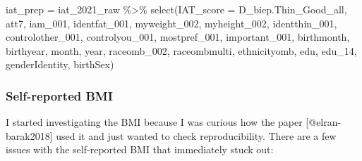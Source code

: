\documentclass[
  letterpaper,
  DIV=11,
  numbers=noendperiod]{scrartcl}
\newenvironment{Shaded}{\begin{snugshade}}{\end{snugshade}}
\newcommand{\AttributeTok}[1]{\textcolor[rgb]{0.40,0.45,0.13}{#1}}
\newcommand{\FunctionTok}[1]{\textcolor[rgb]{0.28,0.35,0.67}{#1}}
\newcommand{\NormalTok}[1]{\textcolor[rgb]{0.00,0.23,0.31}{#1}}
\newcommand{\OtherTok}[1]{\textcolor[rgb]{0.00,0.23,0.31}{#1}}
\newcommand{\SpecialCharTok}[1]{\textcolor[rgb]{0.37,0.37,0.37}{#1}}
\begin{document}
\begin{Shaded}
\begin{Highlighting}[]
\NormalTok{iat\_prep }\OtherTok{=}\NormalTok{ iat\_2021\_raw }\SpecialCharTok{\%\textgreater{}\%} 
  \FunctionTok{select}\NormalTok{(}\AttributeTok{IAT\_score =}\NormalTok{ D\_biep.Thin\_Good\_all, }
\NormalTok{         att7, iam\_001, identfat\_001, }
\NormalTok{         myweight\_002, myheight\_002,}
\NormalTok{         identthin\_001, controlother\_001, }
\NormalTok{         controlyou\_001, mostpref\_001,}
\NormalTok{         important\_001, }
\NormalTok{         birthmonth, birthyear, month, year, }
\NormalTok{         raceomb\_002, raceombmulti, ethnicityomb, }
\NormalTok{         edu, edu\_14, }
\NormalTok{         genderIdentity, }
\NormalTok{         birthSex)}
\end{Highlighting}
\end{Shaded}

\hypertarget{self-reported-bmi}{%
\subsubsection{Self-reported BMI}\label{self-reported-bmi}}

I started investigating the BMI because I was curious how the paper
{[}@elran-barak2018{]} used it and just wanted to check reproducibility.
There are a few issues with the self-reported BMI that immediately stuck
out:
\end{document}
